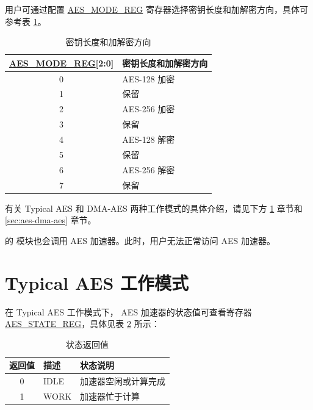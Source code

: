 \documentclass[main\_\_CN.tex]{subfiles}
\begin{document}
用户可通过配置 \hyperref[regdesc:AESMODEREG]{AES\_MODE\_REG} 寄存器选择密钥长度和加解密方向，具体可参考表 \ref{tab:aes-operation}。

\begin{longtable}[c]{ | c | l | }
\caption{密钥长度和加解密方向}
\label{tab:aes-operation}
\\\hline 
\rowcolor{lightgray}
\textbf{\hyperref[regdesc:AESMODEREG]{AES\_MODE\_REG}[2:0]}     & \textbf{密钥长度和加解密方向}\\
    \hline
    0                   & AES-128 加密    \\
    \hline
    1                   & 保留    \\
    \hline
    2                   & AES-256 加密    \\
    \hline
    3                   & 保留    \\
    \hline
    4                   & AES-128 解密    \\
    \hline
    5                   & 保留    \\
    \hline
    6                   & AES-256 解密    \\
    \hline
    7                   & 保留    \\
    \hline
\end{longtable}

有关 Typical AES 和 DMA-AES 两种工作模式的具体介绍，请见下方 \ref{sec:aes-typical-modes} 章节和 \ref{sec:aes-dma-aes} 章节。

\begin{importantlisting}
\vspace{-0.5em}

    \chipname{} 的  模块也会调用 AES 加速器。此时，用户无法正常访问 AES 加速器。
\end{importantlisting}

\section{Typical AES 工作模式}\label{sec:aes-typical-modes}

在 Typical AES 工作模式下，
AES 加速器的状态值可查看寄存器 \hyperref[regdesc:AESSTATEREG]{AES\_STATE\_REG}，具体见表 \ref{tab:aes-state-value-typical} 所示：

\begin{longtable}[c]{ |c | l | l | }
\caption{状态返回值}
\label{tab:aes-state-value-typical}
\\\hline 
\rowcolor{lightgray}
\textbf{返回值} & \textbf{描述} &  \textbf{状态说明} \\ \hline

    0                   & IDLE      &   加速器空闲或计算完成\\ \hline
    1                   & WORK      &   加速器忙于计算     \\ \hline
\end{longtable}
\end{document}

